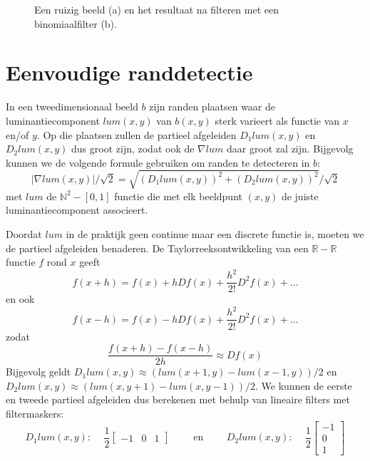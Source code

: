\begin{figure}[bp]
\vspace{10pt}
\centering
{}
\hspace{1cm}
\caption{\label{fig:indische_ruizig_en_binom}Een ruizig beeld (a) en het resultaat na 
filteren met een binomiaalfilter (b).}
\end{figure}

\section{Eenvoudige randdetectie}
\label{sectie:randdetectie}

In een tweedimensionaal beeld $b$ zijn randen plaatsen waar de luminantiecomponent $lum(x,y)$ van $b(x,y)$ 
sterk varieert als functie van $x$ en/of $y$. Op die plaatsen zullen de partieel afgeleiden $D_1 lum(x,y)$ en 
$D_2 lum(x,y)$ dus groot zijn, zodat ook de  $\nabla lum$ daar groot zal zijn. Bijgevolg kunnen we
de volgende formule gebruiken om randen te detecteren in $b$: 
\begin{displaymath}
|\nabla lum(x,y)| / \sqrt{2} = \sqrt{(D_1 lum(x,y))^2 + (D_2 lum(x,y))^2} / \sqrt{2}
\end{displaymath}
met $lum$ de $\mathbb{N}^2 - [0,1]$ functie die met elk beeldpunt $(x,y)$ de juiste luminantiecomponent associeert.

Doordat $lum$ in de praktijk geen continue maar een discrete functie is, moeten we de partieel afgeleiden benaderen.
De Taylorreeksontwikkeling van een $\mathbb{R} - \mathbb{R}$ functie $f$ rond $x$ geeft
\begin{displaymath}
f(x+h) = f(x) + h D f(x) + \frac{h^2}{2!} D^2 f(x) + \ldots
\end{displaymath}
en ook
\begin{displaymath}
f(x-h) = f(x) - h D f(x) + \frac{h^2}{2!} D^2 f(x) + \ldots
\end{displaymath}
zodat
\begin{displaymath}
\frac{f(x+h) - f(x-h)}{2h} \approx D f(x)
\end{displaymath}
Bijgevolg geldt $D_1 lum(x,y) \approx (lum(x+1,y) - lum(x-1,y))/2$ en $D_2 lum(x,y) \approx (lum(x,y+1) - lum(x,y-1))/2$. We
kunnen de eerste en tweede partieel afgeleiden dus berekenen met behulp van lineaire filters met filtermaskers:
\begin{displaymath}
D_1 lum(x,y)\textrm{: }\quad \frac{1}{2} \left[ \begin{array}{ccc} -1 & 0 & 1 \end{array} \right] \qquad \textrm{ en } 
\qquad D_2 lum(x,y)\textrm{: }\quad \frac{1}{2} \left[ \begin{array}{c} -1 \\ 0 \\ 1 \end{array} \right]
\end{displaymath}

